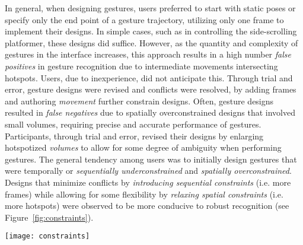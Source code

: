 In general, when designing gestures, users preferred to start with static poses or specify only the end point of a gesture trajectory, utilizing only one frame to implement their designs. In simple cases, such as in controlling the side-scrolling platformer, these designs did suffice. However, as the quantity and complexity of gestures in the interface increases, this approach results in a high number \emph{false positives} in gesture recognition due to intermediate movements intersecting hotspots. Users, due to inexperience, did not anticipate this. Through trial and error, gesture designs were revised and conflicts were resolved, by adding frames and authoring \emph{movement} further constrain designs. Often, gesture designs resulted in \emph{false negatives} due to spatially overconstrained designs that involved small volumes, requiring precise and accurate performance of gestures. Participants, through trial and error, revised their designs by enlarging hotspotized \emph{volumes} to allow for some degree of ambiguity when performing gestures. The general tendency among users was to initially design gestures that were temporally or \emph{sequentially underconstrained} and \emph{spatially overconstrained}. Designs that minimize conflicts by \emph{introducing sequential constraints} (i.e. more frames) while allowing for some flexibility by \emph{relaxing spatial constraints} (i.e. more hotspots) were observed to be more conducive to robust recognition (see Figure~\ref{fig:constraints}).

\begin{SCfigure}[\sidecaptionrelwidth][ht]
\centering
\texttt{[image: constraints]}
\caption{Initially, users preferred gesture designs that involved small hotspots and unspecified motion. Frames were added to constrain motion, and hotspots were enlarge to allow for variations during gesturing. Here, both panes depict hotspot configurations that may be used for a "punch" gesture. The configuration on the right is more conducive to robust recognition because of its sequentially constrained and spatially relaxed nature, compared to the rather extremely simplistic design on the left.}
\label{fig:constraints}
\end{SCfigure}